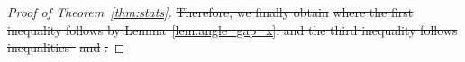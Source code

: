 \documentclass[lettersize,onecolumn,journal]{IEEEtran}
\theoremstyle{definition}
\theoremstyle{definition}
\newcommand{\of}[1]{\left(#1\right)}
\newcommand{\off}[1]{\left[#1\right]}
\newcommand{\offf}[1]{\left\{#1\right\}}
\providecommand{\DIFdeltex}[1]{{\protect\color{red}\sout{#1}}}                      %
\providecommand{\DIFdel}[1]{\texorpdfstring{\DIFdeltex{#1}}{}} %
\begin{document}
\begin{proof}[Proof of Theorem~\ref{thm:stats}]
\DIFdel{Therefore, we finally obtain 
}%
\DIFdel{where the first inequality follows by Lemma~\ref{lem:angle_gap_x}, and the third inequality follows inequalities~}%
\DIFdel{and }%
\DIFdel{.
}%




\end{proof}
\end{document}
